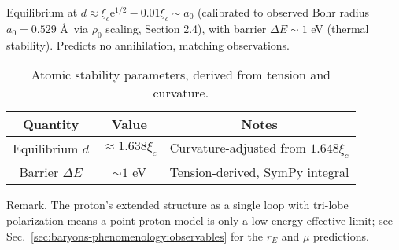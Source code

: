 Equilibrium at $d \approx \xi_c \mathrm e^{1/2} - 0.01 \xi_c \sim a_0$ (calibrated to observed Bohr radius $a_0 = 0.529$ \AA~via $\rho_0$ scaling, Section 2.4), with barrier $\Delta E \sim 1$ eV (thermal stability). Predicts no annihilation, matching observations.

\begin{table}[h!]
\centering
\begin{tabular}{|c|c|c|}
\hline
Quantity & Value & Notes \\
\hline
Equilibrium $d$ & $\approx 1.638 \xi_c$ & Curvature-adjusted from $1.648 \xi_c$ \\
Barrier $\Delta E$ & $\sim 1$ eV & Tension-derived, SymPy integral \\
\hline
\end{tabular}
\caption{Atomic stability parameters, derived from tension and curvature.}
\label{tab:atomic}
\end{table}


Remark. The proton’s extended structure as a single loop with tri-lobe polarization means a point-proton model is only a low-energy effective limit; see Sec.~\ref{sec:baryons-phenomenology:observables} for the $r_E$ and $\mu$ predictions.
